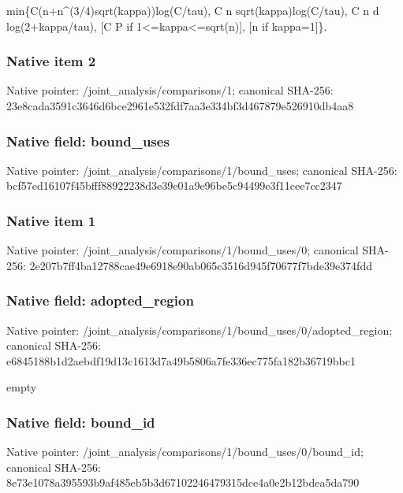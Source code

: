 \documentclass[10pt,a4paper]{article}
\begin{document}
\begingroup\raggedright\sloppy min\{C(n+n\textasciicircum{}(3/\allowbreak{}4)sqrt(kappa))log(C/\allowbreak{}tau),\allowbreak{} C n sqrt(kappa)log(C/\allowbreak{}tau),\allowbreak{} C n d log(2+kappa/\allowbreak{}tau),\allowbreak{} [C P if 1<=\allowbreak{}kappa<=\allowbreak{}sqrt(n)],\allowbreak{} [n if kappa=\allowbreak{}1]\}.\par\endgroup

\subsubsection{Native item 2}
Native pointer: /joint\_\allowbreak{}analysis/comparisons/1; canonical SHA-256: 23e8cada3591c3646d6bce2961e532fdf7aa3e334bf3d467879e526910db4aa8

\subsubsection{Native field: bound\_\allowbreak{}uses}
Native pointer: /joint\_\allowbreak{}analysis/comparisons/1/bound\_\allowbreak{}uses; canonical SHA-256: bcf57ed16107f45bfff88922238d3e39e01a9e96be5c94499e3f11cee7cc2347

\subsubsection{Native item 1}
Native pointer: /joint\_\allowbreak{}analysis/comparisons/1/bound\_\allowbreak{}uses/0; canonical SHA-256: 2e207b7ff4ba12788cae49e6918e90ab065c3516d945f70677f7bde39e374fdd

\subsubsection{Native field: adopted\_\allowbreak{}region}
Native pointer: /joint\_\allowbreak{}analysis/comparisons/1/bound\_\allowbreak{}uses/0/adopted\_\allowbreak{}region; canonical SHA-256: e6845188b1d2aebdf19d13c1613d7a49b5806a7fe336ec775fa182b36719bbc1

\begingroup\raggedright\sloppy empty\par\endgroup

\subsubsection{Native field: bound\_\allowbreak{}id}
Native pointer: /joint\_\allowbreak{}analysis/comparisons/1/bound\_\allowbreak{}uses/0/bound\_\allowbreak{}id; canonical SHA-256: 8e73e1078a395593b9af485eb5b3d67102246479315dce4a0e2b12bdea5da790
\end{document}
